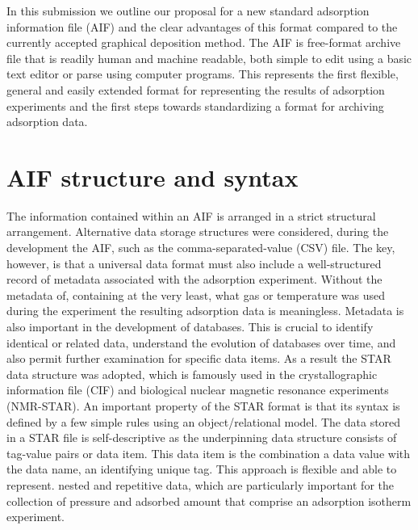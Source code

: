 \documentclass[journal=langd5,manuscript=article]{achemso}
\begin{document}
In this submission we outline our proposal for a new standard adsorption information file (AIF) and the clear advantages of this format compared to the currently accepted graphical deposition method.
The AIF is free-format archive file that is readily human and machine readable, both simple to edit using a basic text editor or parse using computer programs.
This represents the first flexible, general and easily extended format for representing the results of adsorption experiments and the first steps towards standardizing a format for archiving adsorption data. 

\section{AIF structure and syntax}
The information contained within an AIF is arranged in a strict structural arrangement.
Alternative data storage structures were considered, during the development the AIF,  such as the comma-separated-value (CSV) file.
The key, however, is that a universal data format must also include a well-structured record of metadata associated with the adsorption experiment.
Without the metadata of, containing at the very least, what gas or temperature was used during the experiment the resulting adsorption data is meaningless.
Metadata is also important in the development of databases.
This is crucial to identify identical or related data, understand the evolution of databases over time, and also permit further examination for specific data items.
As a result the STAR data structure was adopted,\cite{10.1021/ci00019a005} which is famously used in the crystallographic information file (CIF) and biological nuclear magnetic resonance experiments (NMR-STAR).\cite{10.1107/S010876739101067X,10.1007/s10858-018-0220-3}
An important property of the STAR format is that its syntax is defined by a few simple rules using an object/relational model.
The data stored in a STAR file is self-descriptive as the underpinning data structure consists of tag-value pairs or data item.
This data item is the combination a data value with the data name, an identifying unique tag.
This approach is flexible and able to represent. nested and repetitive data, which are particularly important for the collection of pressure and adsorbed amount that comprise an adsorption isotherm experiment.
\end{document}
